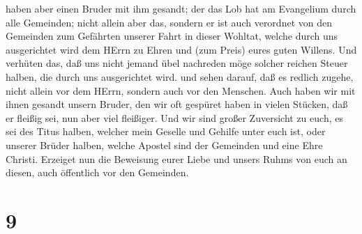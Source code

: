 haben aber einen Bruder mit ihm gesandt; der das Lob hat am Evangelium
durch alle Gemeinden;  nicht allein aber das, sondern er
ist auch verordnet von den Gemeinden zum Gefährten unserer Fahrt in
dieser Wohltat, welche durch uns ausgerichtet wird dem HErrn zu Ehren
und (zum Preis) eures guten Willens.  Und verhüten das, daß
uns nicht jemand übel nachreden möge solcher reichen Steuer halben, die
durch uns ausgerichtet wird.  und sehen darauf, daß es
redlich zugehe, nicht allein vor dem HErrn, sondern auch vor den
Menschen.  Auch haben wir mit ihnen gesandt unsern Bruder,
den wir oft gespüret haben in vielen Stücken, daß er fleißig sei, nun
aber viel fleißiger.  Und wir sind großer Zuversicht zu
euch, es sei des Titus halben, welcher mein Geselle und Gehilfe unter
euch ist, oder unserer Brüder halben, welche Apostel sind der Gemeinden
und eine Ehre Christi.  Erzeiget nun die Beweisung eurer
Liebe und unsers Ruhms von euch an diesen, auch öffentlich vor den
Gemeinden.

\hypertarget{section-8}{%
\section{9}\label{section-8}}

